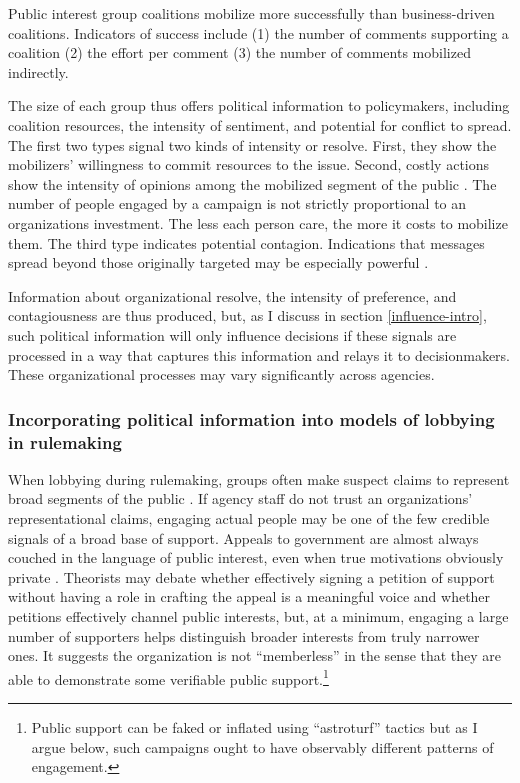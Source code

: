 \begin{subhyp}
\begin{hyp}
Public interest group coalitions mobilize more successfully than business-driven coalitions. Indicators of success include (1) the number of comments supporting a coalition (2) the effort per comment (3) the number of comments mobilized indirectly. 
\end{hyp}

\end{subhyp}

The size of each group thus offers political information to policymakers, including coalition resources, the intensity of sentiment, and potential for conflict to spread.
The first two types signal two kinds of intensity or resolve. First, they show the mobilizers' willingness to commit resources to the issue. Second, costly actions show the intensity of opinions among the mobilized segment of the public \citep{Dunleavy1991}. The number of people engaged by a campaign is not strictly proportional to an organizations investment. The less each person care, the more it costs to mobilize them. The third type indicates potential contagion. Indications that messages spread beyond those originally targeted may be especially powerful \citep{Kollman1998}. 

Information about organizational resolve, the intensity of preference, and contagiousness are thus produced, but, as I discuss in section \ref{influence-intro}, such political information will only influence decisions if these signals are processed in a way that captures this information and relays it to decisionmakers. These organizational processes may vary significantly across agencies.

\subsubsection{Incorporating political information into models of lobbying in rulemaking}
When lobbying during rulemaking, groups often make suspect claims to represent broad segments of the public \citep{Seifter2016UCLA}. %
If agency staff do not trust an organizations' representational claims, engaging actual people may be one of the few credible signals of a broad base of support.
Appeals to government are almost always couched in the language of public interest, even when true motivations obviously private \citep{Schattschneider1975}. Theorists may debate whether effectively signing a petition of support without having a role in crafting the appeal is a meaningful voice and whether petitions effectively channel public interests, but, at a minimum, engaging a large number of supporters helps distinguish broader interests from truly narrower ones. It suggests the organization is not ``memberless'' \citep{Skocpol2003} in the sense that they are able to demonstrate some verifiable public support.\footnote{
Public support can be faked or inflated using ``astroturf'' tactics but as I argue below, such campaigns ought to have observably different patterns of engagement.}


